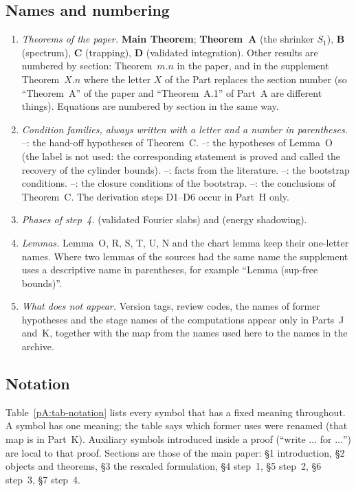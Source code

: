 \subsection{Names and numbering}\label{pA:sec-names}
\begin{enumerate}[label=(\arabic*)]
\item \emph{Theorems of the paper.} \textbf{Main Theorem}; \textbf{Theorem~A} (the shrinker $S_1$), \textbf{B} (spectrum), \textbf{C} (trapping), \textbf{D} (validated integration). Other results are numbered by section: Theorem~$m.n$ in the paper, and in the supplement Theorem~$X.n$ where the letter $X$ of the Part replaces the section number (so ``Theorem~A'' of the paper and ``Theorem~A.1'' of Part~A are different things). Equations are numbered by section in the same way.
\item \emph{Condition families, always written with a letter and a number in parentheses.} --: the hand-off hypotheses of Theorem~C. --: the hypotheses of Lemma~O (the label  is not used: the corresponding statement is proved and called the recovery of the cylinder bounds). --: facts from the literature. --: the bootstrap conditions. --: the closure conditions of the bootstrap. --: the conclusions of Theorem~C. The derivation steps D1--D6 occur in Part~H only.
\item \emph{Phases of step~4.} \PhaseI{} (validated Fourier slabs) and \PhaseII{} (energy shadowing).
\item \emph{Lemmas.} Lemma~O, R, S, T, U, N and the chart lemma keep their one-letter names. Where two lemmas of the sources had the same name the supplement uses a descriptive name in parentheses, for example ``Lemma (sup-free bounds)''.
\item \emph{What does not appear.} Version tags, review codes, the names of former hypotheses and the stage names of the computations appear only in Parts~J and~K, together with the map from the names used here to the names in the archive.
\end{enumerate}

\subsection{Notation}\label{pA:sec-notation}
Table~\ref{pA:tab-notation} lists every symbol that has a fixed meaning throughout. A symbol has one meaning; the table says which former uses were renamed (that map is in Part~K). Auxiliary symbols introduced inside a proof (``write $\dots$ for $\dots$'') are local to that proof. Sections are those of the main paper: \S1 introduction, \S2 objects and theorems, \S3 the rescaled formulation, \S4 step~1, \S5 step~2, \S6 step~3, \S7 step~4.

